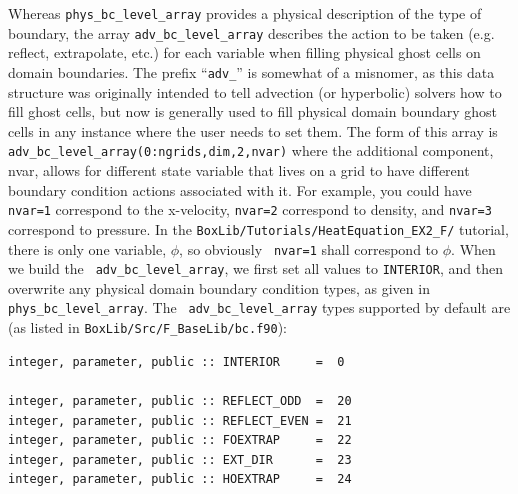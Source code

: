 Whereas {\tt phys\_bc\_level\_array} provides a physical description
of the type of boundary, the array {\tt adv\_bc\_level\_array}
describes the action to be taken (e.g. reflect, extrapolate, etc.) for
each variable when filling physical ghost cells on domain boundaries.
The prefix ``{\tt adv\_}'' is somewhat of a misnomer, as this data
structure was originally intended to tell advection (or hyperbolic)
solvers how to fill ghost cells, but now is generally used to fill
physical domain boundary ghost cells in any instance where the user
needs to set them.  The form of this array is {\tt
  adv\_bc\_level\_array(0:ngrids,dim,2,nvar)} where the additional
component, nvar, allows for different state variable that lives on a
grid to have different boundary condition actions associated with it.
For example, you could have {\tt nvar=1} correspond to the x-velocity,
{\tt nvar=2} correspond to density, and {\tt nvar=3} correspond to
pressure.  In the {\tt BoxLib/Tutorials/HeatEquation\_EX2\_F/}
tutorial, there is only one variable, $\phi$, so obviously {\tt
  nvar=1} shall correspond to $\phi$.  When we build the {\tt
  adv\_bc\_level\_array}, we first set all values to {\tt INTERIOR},
and then overwrite any physical domain boundary condition types, as
given in {\tt phys\_bc\_level\_array}.  The {\tt
  adv\_bc\_level\_array} types supported by default are (as listed in
{\tt BoxLib/Src/F\_BaseLib/bc.f90}):
\begin{lstlisting}[backgroundcolor=\color{light-green}]
integer, parameter, public :: INTERIOR     =  0

integer, parameter, public :: REFLECT_ODD  =  20
integer, parameter, public :: REFLECT_EVEN =  21
integer, parameter, public :: FOEXTRAP     =  22
integer, parameter, public :: EXT_DIR      =  23
integer, parameter, public :: HOEXTRAP     =  24
\end{lstlisting}

